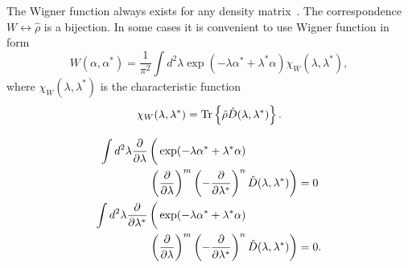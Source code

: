 The Wigner function always exists for any density matrix~\cite{Gardiner2004}.
The correspondence $W \leftrightarrow \hat{\rho}$ is a bijection.
In some cases it is convenient to use Wigner function in form
\begin{equation}
\label{eqn:sm-wigner:w-function}
	W (\alpha, \alpha^*)
	= \frac{1}{\pi^2} \int d^2 \lambda \exp(-\lambda \alpha^* + \lambda^* \alpha)
		\chi_W (\lambda, \lambda^*),
\end{equation}
where $\chi_W (\lambda, \lambda^*)$ is the characteristic function
\begin{equation}
	\chi_W (\lambda, \lambda^*)
	= \operatorname{Tr} \left\{  \hat{\rho} \hat{D}(\lambda, \lambda^*)  \right\}.
\end{equation}

\begin{lemma}
\label{lmm:sm-wigner:zero-integrals}
	\begin{equation*}
	\begin{split}
		\int d^2\lambda
			\frac{\partial}{\partial \lambda} & \left(
				\vphantom{\left( \frac{\partial}{\partial \lambda} \right)^m} %
				\exp(-\lambda \alpha^* + \lambda^* \alpha)
			\right. \\
			& \left.
				\left( \frac{\partial}{\partial \lambda} \right)^m
				\left( -\frac{\partial}{\partial \lambda^*} \right)^n
				\hat{D}(\lambda, \lambda^*)
			\right)
		= 0 \\
		\int d^2\lambda
			\frac{\partial}{\partial \lambda^*} & \left(
				\vphantom{\left( \frac{\partial}{\partial \lambda} \right)^m} %
				\exp(-\lambda \alpha^* + \lambda^* \alpha)
			\right. \\
			& \left.
				\left( \frac{\partial}{\partial \lambda} \right)^m
				\left( -\frac{\partial}{\partial \lambda^*} \right)^n
				\hat{D}(\lambda, \lambda^*)
			\right)
		= 0.
	\end{split}
	\end{equation*}
\end{lemma}

